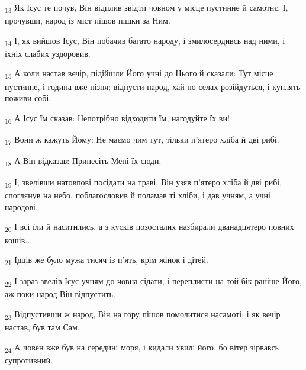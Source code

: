 \begin{tcolorbox}
\textsubscript{13} Як Ісус те почув, Він відплив звідти човном у місце пустинне й самотнє. І, прочувши, народ із міст пішов пішки за Ним.
\end{tcolorbox}
\begin{tcolorbox}
\textsubscript{14} І, як вийшов Ісус, Він побачив багато народу, і змилосердивсь над ними, і їхніх слабих уздоровив.
\end{tcolorbox}
\begin{tcolorbox}
\textsubscript{15} А коли настав вечір, підійшли Його учні до Нього й сказали: Тут місце пустинне, і година вже пізня; відпусти народ, хай по селах розійдуться, і куплять поживи собі.
\end{tcolorbox}
\begin{tcolorbox}
\textsubscript{16} А Ісус їм сказав: Непотрібно відходити їм, нагодуйте їх ви!
\end{tcolorbox}
\begin{tcolorbox}
\textsubscript{17} Вони ж кажуть Йому: Не маємо чим тут, тільки п'ятеро хліба й дві рибі.
\end{tcolorbox}
\begin{tcolorbox}
\textsubscript{18} А Він відказав: Принесіть Мені їх сюди.
\end{tcolorbox}
\begin{tcolorbox}
\textsubscript{19} І, звелівши натовпові посідати на траві, Він узяв п'ятеро хліба й дві рибі, споглянув на небо, поблагословив й поламав ті хліби, і дав учням, а учні народові.
\end{tcolorbox}
\begin{tcolorbox}
\textsubscript{20} І всі їли й наситились, а з кусків позосталих назбирали дванадцятеро повних кошів...
\end{tcolorbox}
\begin{tcolorbox}
\textsubscript{21} Їдців же було мужа тисяч із п'ять, крім жінок і дітей.
\end{tcolorbox}
\begin{tcolorbox}
\textsubscript{22} І зараз звелів Ісус учням до човна сідати, і переплисти на той бік раніше Його, аж поки народ Він відпустить.
\end{tcolorbox}
\begin{tcolorbox}
\textsubscript{23} Відпустивши ж народ, Він на гору пішов помолитися насамоті; і як вечір настав, був там Сам.
\end{tcolorbox}
\begin{tcolorbox}
\textsubscript{24} А човен вже був на середині моря, і кидали хвилі його, бо вітер зірвавсь супротивний.
\end{tcolorbox}
